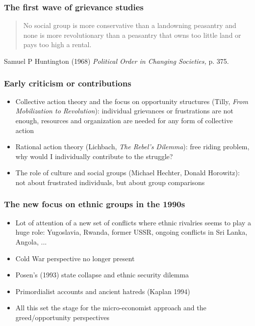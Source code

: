 \documentclass[utf8, xcolor=dvipsnames]{beamer}
\begin{document}
\begin{frame}
\frametitle{The first wave of grievance studies}
\centering

\begin{quote}
No social group is more conservative than a landowning peasantry and none is more revolutionary than a peasantry that owns too little land or pays too high a rental.
\end{quote}

\vspace{10pt}

{\footnotesize Samuel P Huntington (1968) \textit{Political Order in Changing Societies,} p. 375.}

\end{frame}

\begin{frame}
\frametitle{Early criticism or contributions}
\centering

\begin{itemize}[<+->]
  \item Collective action theory and the focus on opportunity structures (Tilly, \textit{From Mobilization to Revolution}): individual grievances or frustrations are not enough, resources and organization are needed for any form of collective action
  \item Rational action theory (Lichbach, \textit{The Rebel's Dilemma}): free riding problem, why would I individually contribute to the struggle?
  \item The role of culture and social groups (Michael Hechter, Donald Horowitz): not about frustrated individuals, but about group comparisons
\end{itemize}

\end{frame}

\begin{frame}
\frametitle{The new focus on ethnic groups in the 1990s}
\centering

\begin{itemize}[<+->]
  \item Lot of attention of a new set of conflicts where ethnic rivalries seems to play a huge role: Yugoslavia, Rwanda, former USSR, ongoing conflicts in Sri Lanka, Angola, ...
  \item Cold War perspective no longer present
  \item Posen's (1993) state collapse and ethnic security dilemma
  \item Primordialist accounts and ancient hatreds (Kaplan 1994)
  \item All this set the stage for the micro-economist approach and the greed/opportunity perspectives
\end{itemize}

\end{frame}
\end{document}
